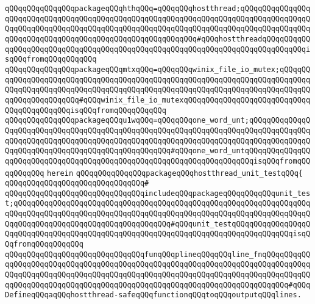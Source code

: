 \verb|qQQqqQQqqQQqqQQqpackageqQQqhthqQQq=qQQqqQQqhostthread;qQQqqQQqqQQqqQQqqQQqqQQqqQQqqQQqqQQqqQQqqQQqqQQqqQQqqQQqqQQqqQQqqQQqqQQqqQQqqQQqqQQqqQQqqQQqqQQqqQQqqQQqqQQqqQQqqQQqqQQqqQQqqQQqqQQqqQQqqQQqqQQqqQQqqQQqqQQqqQQqqQQqqQQqqQQqqQQqqQQqqQQqqQQqqQQqqQQqqQQq#qQQqhostthreadqQQqqQQqqQQqqQQqqQQqqQQqqQQqqQQqqQQqqQQqqQQqqQQqqQQqqQQqqQQqqQQqqQQqqQQqqQQqqQQqisqQQqfromqQQqqQQqqQQq|\newline
\verb|qQQqqQQqqQQqqQQqpackageqQQqmtxqQQq=qQQqqQQqwinix_file_io_mutex;qQQqqQQqqQQqqQQqqQQqqQQqqQQqqQQqqQQqqQQqqQQqqQQqqQQqqQQqqQQqqQQqqQQqqQQqqQQqqQQqqQQqqQQqqQQqqQQqqQQqqQQqqQQqqQQqqQQqqQQqqQQqqQQqqQQqqQQqqQQqqQQqqQQqqQQqqQQqqQQqqQQq#qQQqwinix_file_io_mutexqQQqqQQqqQQqqQQqqQQqqQQqqQQqqQQqqQQqqQQqqQQqisqQQqfromqQQqqQQqqQQq|\newline
\verb|qQQqqQQqqQQqqQQqpackageqQQqu1wqQQq=qQQqqQQqone_word_unt;qQQqqQQqqQQqqQQqqQQqqQQqqQQqqQQqqQQqqQQqqQQqqQQqqQQqqQQqqQQqqQQqqQQqqQQqqQQqqQQqqQQqqQQqqQQqqQQqqQQqqQQqqQQqqQQqqQQqqQQqqQQqqQQqqQQqqQQqqQQqqQQqqQQqqQQqqQQqqQQqqQQqqQQqqQQqqQQqqQQqqQQqqQQqqQQq#qQQqone_word_untqQQqqQQqqQQqqQQqqQQqqQQqqQQqqQQqqQQqqQQqqQQqqQQqqQQqqQQqqQQqqQQqqQQqqQQqisqQQqfromqQQqqQQqqQQq|\newline
\verb|herein|\newline
\newline
\verb|qQQqqQQqqQQqqQQqpackageqQQqhostthread_unit_testqQQq{|\newline
\verb|qQQqqQQqqQQqqQQqqQQqqQQqqQQqqQQq#|\newline
\verb|qQQqqQQqqQQqqQQqqQQqqQQqqQQqqQQqincludeqQQqpackageqQQqqQQqqQQqunit_test;qQQqqQQqqQQqqQQqqQQqqQQqqQQqqQQqqQQqqQQqqQQqqQQqqQQqqQQqqQQqqQQqqQQqqQQqqQQqqQQqqQQqqQQqqQQqqQQqqQQqqQQqqQQqqQQqqQQqqQQqqQQqqQQqqQQqqQQqqQQqqQQqqQQqqQQqqQQqqQQqqQQqqQQqqQQqqQQq#qQQqunit_testqQQqqQQqqQQqqQQqqQQqqQQqqQQqqQQqqQQqqQQqqQQqqQQqqQQqqQQqqQQqqQQqqQQqqQQqqQQqqQQqqQQqisqQQqfromqQQqqQQqqQQq|\newline
\newline
\verb|qQQqqQQqqQQqqQQqqQQqqQQqqQQqqQQqfunqQQqplineqQQqqQQqline_fnqQQqqQQqqQQqqQQqqQQqqQQqqQQqqQQqqQQqqQQqqQQqqQQqqQQqqQQqqQQqqQQqqQQqqQQqqQQqqQQqqQQqqQQqqQQqqQQqqQQqqQQqqQQqqQQqqQQqqQQqqQQqqQQqqQQqqQQqqQQqqQQqqQQqqQQqqQQqqQQqqQQqqQQqqQQqqQQqqQQqqQQqqQQqqQQqqQQqqQQqqQQqqQQqqQQqqQQq#qQQqDefineqQQqaqQQqhostthread-safeqQQqfunctionqQQqtoqQQqoutputqQQqlines.|\newline
